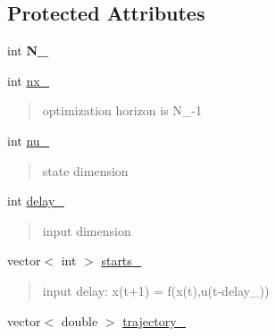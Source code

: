 \subsection*{Protected Attributes}
\begin{DoxyCompactItemize}
\item 
\mbox{\label{classModel_aa6c6273a32932807a0493a4bbbddc3ac}} 
int {\bfseries N\+\_\+}
\item 
\mbox{\label{classModel_aa6366c28ab7954d88654d8068e6d2fcf}} 
int \mbox{\hyperlink{classModel_aa6366c28ab7954d88654d8068e6d2fcf}{nx\+\_\+}}
\begin{DoxyCompactList}\small\item\em \begin{quote}
optimization horizon is N\+\_\+-\/1\end{quote}
\end{DoxyCompactList}\item 
\mbox{\label{classModel_a15ec07a022d857863dcde067d0103aa5}} 
int \mbox{\hyperlink{classModel_a15ec07a022d857863dcde067d0103aa5}{nu\+\_\+}}
\begin{DoxyCompactList}\small\item\em \begin{quote}
state dimension\end{quote}
\end{DoxyCompactList}\item 
\mbox{\label{classModel_aac68536265db5eab9bb3967db61c8f70}} 
int \mbox{\hyperlink{classModel_aac68536265db5eab9bb3967db61c8f70}{delay\+\_\+}}
\begin{DoxyCompactList}\small\item\em \begin{quote}
input dimension\end{quote}
\end{DoxyCompactList}\item 
\mbox{\label{classModel_a9ae228c1b5463523cf3f3a844ec7ffc5}} 
vector$<$ int $>$ \mbox{\hyperlink{classModel_a9ae228c1b5463523cf3f3a844ec7ffc5}{starts\+\_\+}}
\begin{DoxyCompactList}\small\item\em \begin{quote}
input delay\+: x(t+1) = f(x(t),u(t-\/delay\+\_\+))\end{quote}
\end{DoxyCompactList}\item 
vector$<$ double $>$ \mbox{\hyperlink{classModel_aa44a513ae9e81e8d3ed3e2add680367f}{trajectory\+\_\+}}
\end{DoxyCompactItemize}


